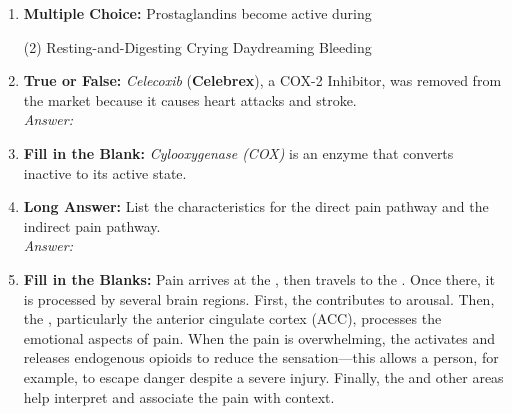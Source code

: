 \begin{enumerate}[label=\textbf{Q3.2.\arabic*}]
    \item \textbf{Multiple Choice:} Prostaglandins become active during
        \begin{tasks}[label=\textcolor{\documentTheme}{(\Alph*)}, item-format=\color{\documentTheme}, label-width=1.5em, item-indent=1.7em](2)
            \task Resting-and-Digesting
            \task Crying
            \task Daydreaming 
            \task Bleeding
        \end{tasks}
    \item \textbf{True or False:} \textit{Celecoxib} (\textbf{Celebrex}), a COX-2 Inhibitor, was removed from the market because it causes heart attacks and stroke. \\
        \textit{Answer:} %

    \item \textbf{Fill in the Blank:} \textit{Cylooxygenase (COX)} is an enzyme that converts inactive \underline{\hspace{3cm}} to its active state.

    \item \textbf{Long Answer:} List the characteristics for the direct pain pathway and the indirect pain pathway. \\
        \textit{Answer:} \\[2cm]%

    \item \textbf{Fill in the Blanks:} Pain arrives at the \underline{\hspace{4cm}}, then travels to the \underline{\hspace{3cm}}. Once there, it is processed by several brain regions. First, the \underline{\hspace{3cm}} contributes to arousal. Then, the \underline{\hspace{3cm}}, particularly the anterior cingulate cortex (ACC), processes the emotional aspects of pain. When the pain is overwhelming, the \underline{\hspace{3cm}} activates and releases endogenous opioids to reduce the sensation—this allows a person, for example, to escape danger despite a severe injury. Finally, the \underline{\hspace{3cm}} and other areas help interpret and associate the pain with context. 


\end{enumerate}
